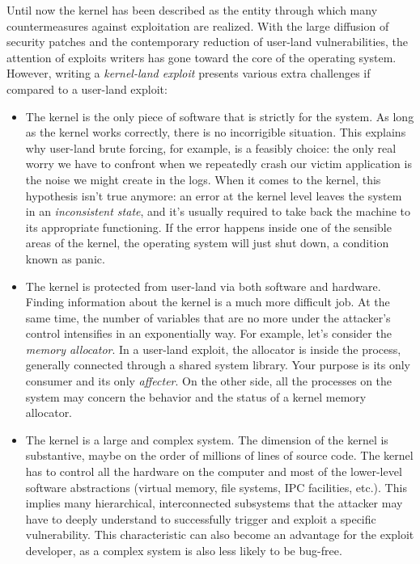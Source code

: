 \documentclass{masterthesis}
\begin{document}
Until now the kernel has been described as the entity through which many countermeasures against exploitation are realized.
With the large diffusion of security patches and the contemporary reduction of user-land vulnerabilities, the attention of exploits writers has gone toward the core of the operating system.
However, writing a \emph{kernel-land exploit} presents various extra challenges if compared to a user-land exploit:
\begin{itemize}
\item The kernel is the only piece of software that is strictly for the system. As long as the kernel works correctly, there is no incorrigible situation.
This explains why user-land brute forcing, for example, is a feasibly choice: the only real worry we have to confront when we repeatedly crash our victim application is the noise we might create in the logs. 
When it comes to the kernel, this hypothesis isn't true anymore: an error at the kernel level leaves the system in an \emph{inconsistent state}, and it's usually required to take back the machine to its appropriate functioning.
 If the error happens inside one of the sensible areas of the kernel, the operating system will just shut down, a condition known as panic.
\item The kernel is protected from user-land via both software and hardware. Finding information about the kernel is a much more difficult job. At the same time, the number of variables that are no more under the attacker’s control intensifies in an exponentially way. For example, let's consider the \emph{memory allocator}.
In a user-land exploit, the allocator is inside the process, generally connected through a shared system library. Your purpose is its only consumer and its only \emph{affecter}. On the other side, all the processes on the system may concern the behavior and the status of a kernel memory allocator.
\item The kernel is a large and complex system. The dimension of the kernel is substantive, maybe on the order of millions of lines of source code. The kernel has to control all the hardware on the computer and most of the lower-level software
abstractions (virtual memory, file systems, IPC facilities, etc.). This implies many hierarchical, interconnected subsystems that the attacker may have to deeply understand to successfully trigger and exploit a specific
vulnerability. This characteristic can also become an advantage for the exploit developer, as a complex system is also less likely to be bug-free.
\end{itemize}
\end{document}
